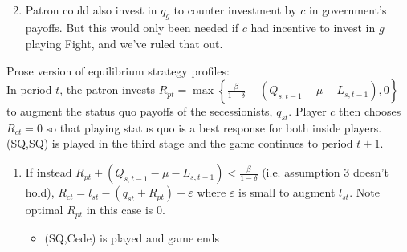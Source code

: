 \documentclass[12pt]{article}
\newcommand{\ve}{\varepsilon}
\newcommand{\de}{\delta}
\begin{document}
\begin{enumerate}
\begin{itemize}
\begin{itemize}
\begin{multline}
						\end{multline}
				\end{itemize}
		\end{itemize}
	\item Patron could also invest in $q_g$ to counter investment by $c$ in government's payoffs. But this would only been needed if $c$ had incentive to invest in $g$ playing Fight, and we've ruled that out.
\end{enumerate}


\newpage
Prose version of equilibrium strategy profiles: \\

In period $t$, the patron invests $R_{pt} = \max\left\{\frac{\beta}{1-\de} - \left( Q_{s,t-1} - \mu - L_{s,t-1}\right),0\right\}$ to augment the status quo payoffs of the secessionists, $q_{st}$. Player $c$ then chooses $R_{ct} =0$ so that playing status quo is a best response for both inside players. (SQ,SQ) is played in the third stage and the game continues to period $t+1$.


\begin{enumerate}
							\item If instead $R_{pt} + \left( Q_{s,t-1} - \mu - L_{s,t-1}\right) < \frac{\beta}{1-\de}$ (i.e. assumption 3 doesn't hold), $R_{ct} = l_{st} - \left(q_{st} + R_{pt} \right) + \ve$ where $\ve$ is small to augment $l_{st}$. Note optimal $R_{pt}$ in this case is 0.
								\begin{itemize}
									\item (SQ,Cede) is played and game ends
								\end{itemize}
						\end{enumerate}
						
\end{document}
